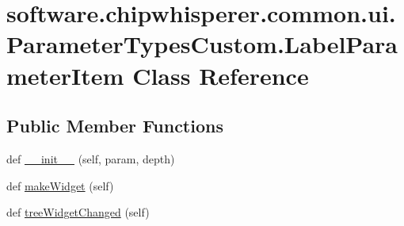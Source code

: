 \hypertarget{classsoftware_1_1chipwhisperer_1_1common_1_1ui_1_1ParameterTypesCustom_1_1LabelParameterItem}{}\section{software.\+chipwhisperer.\+common.\+ui.\+Parameter\+Types\+Custom.\+Label\+Parameter\+Item Class Reference}
\label{classsoftware_1_1chipwhisperer_1_1common_1_1ui_1_1ParameterTypesCustom_1_1LabelParameterItem}
\subsection*{Public Member Functions}
\begin{DoxyCompactItemize}
\item 
def \hyperlink{classsoftware_1_1chipwhisperer_1_1common_1_1ui_1_1ParameterTypesCustom_1_1LabelParameterItem_a09934b9280423fbba855325152951082}{\+\_\+\+\_\+init\+\_\+\+\_\+} (self, param, depth)
\item 
def \hyperlink{classsoftware_1_1chipwhisperer_1_1common_1_1ui_1_1ParameterTypesCustom_1_1LabelParameterItem_a583f44404ff4e3d59e272c7388648dca}{make\+Widget} (self)
\item 
def \hyperlink{classsoftware_1_1chipwhisperer_1_1common_1_1ui_1_1ParameterTypesCustom_1_1LabelParameterItem_a85fcbfa074152e27ceb2634e203a443d}{tree\+Widget\+Changed} (self)
\end{DoxyCompactItemize}

